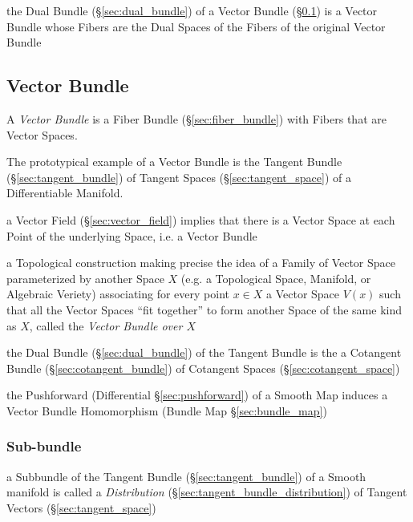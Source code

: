 the Dual Bundle (\S\ref{sec:dual_bundle}) of a Vector Bundle
(\S\ref{sec:vector_bundle}) is a Vector Bundle whose Fibers are the Dual Spaces
of the Fibers of the original Vector Bundle



\subsection{Vector Bundle}\label{sec:vector_bundle}


A \emph{Vector Bundle} is a Fiber Bundle (\S\ref{sec:fiber_bundle}) with Fibers
that are Vector Spaces.

The prototypical example of a Vector Bundle is the Tangent Bundle
(\S\ref{sec:tangent_bundle}) of Tangent Spaces (\S\ref{sec:tangent_space}) of a
Differentiable Manifold.

a Vector Field (\S\ref{sec:vector_field}) implies that there is a Vector Space
at each Point of the underlying Space, i.e. a Vector Bundle

a Topological construction making precise the idea of a Family of Vector Space
parameterized by another Space $X$ (e.g. a Topological Space, Manifold, or
Algebraic Veriety) associating for every point $x \in X$ a Vector Space $V(x)$
such that all the Vector Spaces ``fit together'' to form another Space of the
same kind as $X$, called the \emph{Vector Bundle over $X$}

the Dual Bundle (\S\ref{sec:dual_bundle}) of the Tangent Bundle is the
a Cotangent Bundle (\S\ref{sec:cotangent_bundle}) of
Cotangent Spaces (\S\ref{sec:cotangent_space})

the Pushforward (Differential \S\ref{sec:pushforward}) of a Smooth Map induces a
Vector Bundle Homomorphism (Bundle Map \S\ref{sec:bundle_map})



\subsubsection{Sub-bundle}\label{sec:subbundle}

\fist a Subbundle of the Tangent Bundle (\S\ref{sec:tangent_bundle}) of a
Smooth manifold is called a \emph{Distribution}
(\S\ref{sec:tangent_bundle_distribution}) of Tangent Vectors
(\S\ref{sec:tangent_space})

